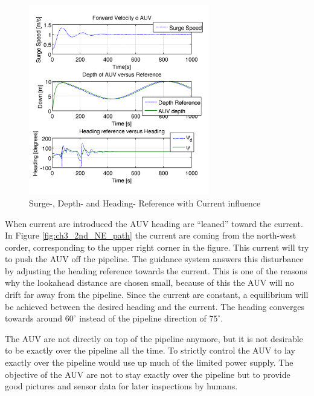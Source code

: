 		\begin{figure}[htbp]
			\centering
			\includegraphics[width=0.70\textwidth]{pics/2nd_uDpsi}
			\caption{Surge-, Depth- and Heading- Reference with Current influence}
			\label{fig:ch3_2nd_uDpsi}
		\end{figure}
		When current are introduced the AUV heading are ``leaned'' toward the current. In Figure
		\ref{fig:ch3_2nd_NE_path} the current are coming from the north-west corder, corresponding to
		the upper right corner in the figure. This current will try to push the
		AUV off the pipeline. The guidance system answers this disturbance by adjusting the heading
		reference towards the current. This is one of the reasons why the lookahead distance are
		chosen small, because of this the AUV will no drift far away from the pipeline. Since the
		current are constant, a equilibrium will be achieved between the desired heading and the
		current. The heading converges towards around $60^{\circ}$ instead of the pipeline direction
		of $75^{\circ}$.

		The AUV are not directly on top of the pipeline anymore, but it is not desirable to be exactly
		over the pipeline all the time. To strictly control the AUV to lay exactly over the pipeline
		would use up much of the limited power supply. The objective of the AUV are not to stay
		exactly over the pipeline but to provide good pictures and sensor data for later inspections 
		by humans. 

	

